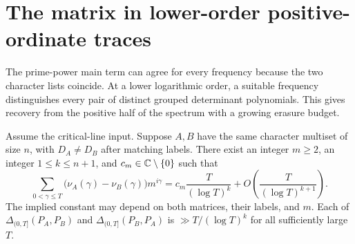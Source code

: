 \section{The matrix in lower-order positive-ordinate traces}
\label{sec:minor-trace}

The prime-power main term can agree for every frequency because the two character lists coincide. At a lower logarithmic order, a suitable frequency distinguishes every pair of distinct grouped determinant polynomials. This gives recovery from the positive half of the spectrum with a growing erasure budget.

\begin{theorem}\label{thm:minortrace}
Assume the critical-line input. Suppose $A,B$ have the same character multiset of size $n$, with $D_A\ne D_B$ after matching labels. There exist an integer $m\ge2$, an integer $1\le k\le n+1$, and $c_m\in\mathbb C\setminus\{0\}$ such that
\[
 \sum_{0<\gamma\le T}\bigl(\nu_A(\gamma)-\nu_B(\gamma)\bigr)m^{i\gamma}
 =c_m\frac{T}{(\log T)^k}
   +O\!\left(\frac{T}{(\log T)^{k+1}}\right).
\]
The implied constant may depend on both matrices, their labels, and $m$. Each of $\Delta_{(0,T]}(P_A,P_B)$ and $\Delta_{(0,T]}(P_B,P_A)$ is $\gg T/(\log T)^k$ for all sufficiently large $T$.
\end{theorem}

